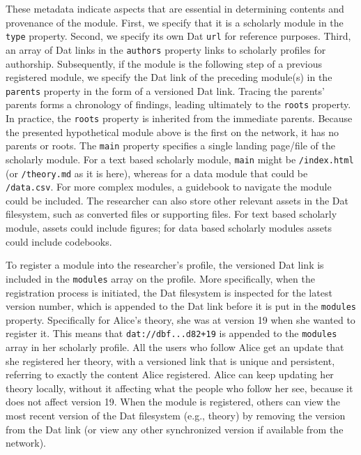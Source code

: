 \documentclass[publications,article,submit,moreauthors,pdftex,10pt,a4paper]{Definitions/mdpi}
\begin{document}
These metadata indicate aspects that are essential in determining
contents and provenance of the module. First, we specify that it is a
scholarly module in the \texttt{type} property. Second, we specify its
own Dat \texttt{url} for reference purposes. Third, an array of Dat
links in the \texttt{authors} property links to scholarly profiles for
authorship. Subsequently, if the module is the following step of a
previous registered module, we specify the Dat link of the preceding
module(s) in the \texttt{parents} property in the form of a versioned
Dat link. Tracing the parents' parents forms a chronology of findings,
leading ultimately to the \texttt{roots} property. In practice, the
\texttt{roots} property is inherited from the immediate parents. Because
the presented hypothetical module above is the first on the network, it
has no parents or roots. The \texttt{main} property specifies a single
landing page/file of the scholarly module. For a text based scholarly
module, \texttt{main} might be \texttt{/index.html} (or
\texttt{/theory.md} as it is here), whereas for a data module that could
be \texttt{/data.csv}. For more complex modules, a guidebook to navigate
the module could be included. The researcher can also store other
relevant assets in the Dat filesystem, such as converted files or
supporting files. For text based scholarly module, assets could include
figures; for data based scholarly modules assets could include
codebooks.

To register a module into the researcher's profile, the versioned Dat
link is included in the \texttt{modules} array on the profile. More
specifically, when the registration process is initiated, the Dat
filesystem is inspected for the latest version number, which is appended
to the Dat link before it is put in the \texttt{modules} property.
Specifically for Alice's theory, she was at version 19 when she wanted
to register it. This means that \texttt{dat://dbf...d82+19} is appended
to the \texttt{modules} array in her scholarly profile. All the users
who follow Alice get an update that she registered her theory, with a
versioned link that is unique and persistent, referring to exactly the
content Alice registered. Alice can keep updating her theory locally,
without it affecting what the people who follow her see, because it does
not affect version 19. When the module is registered, others can view
the most recent version of the Dat filesystem (e.g., theory) by removing
the version from the Dat link (or view any other synchronized version if
available from the network).
\end{document}
